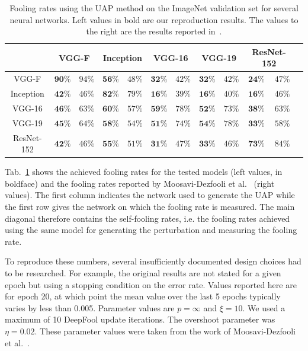 \documentclass[runningheads]{llncs}
\begin{document}
\bgroup

\setlength\tabcolsep{0.19cm}
\begin{table}[htbp]
\centering
\caption{Fooling rates using the UAP method on the ImageNet validation set for several neural networks. Left values in bold are our reproduction results. The values to the right are the results reported in~\cite{moosavidezfooli_universal_2017}.}
\begin{tabular}{|c|c|c|c|c|c|c|c|c|c|c|c|}
\hline

			& \multicolumn{2}{|c|}{VGG-F}			&	\multicolumn{2}{|c|}{Inception}		&	\multicolumn{2}{|c|}{VGG-16}			&	\multicolumn{2}{|c|}{VGG-19}			&	\multicolumn{2}{|c|}{ResNet-152}	\\ \hline
VGG-F		& $\mathbf{90\%} $&$ 94\%$	&	$\mathbf{56\%} $&$ 48\%$	&	$\mathbf{32\%} $&$ 42\%$	&	$\mathbf{32\%} $&$ 42\%$	& 	$\mathbf{24\%} $&$ 47\%$		\\
Inception	& $\mathbf{42\%} $&$ 46\%$	&	$\mathbf{82\%} $&$ 79\%$	&	$\mathbf{16\%} $&$ 39\%$	&	$\mathbf{16\%} $&$ 40\%$	& 	$\mathbf{16\%} $&$ 46\%$	\\
VGG-16		& $\mathbf{46\%} $&$ 63\%$	&	$\mathbf{60\%} $&$ 57\%$	&	$\mathbf{59\%} $&$ 78\%$	&	$\mathbf{52\%} $&$ 73\%$	& 	$\mathbf{38\%} $&$ 63\%$	\\
VGG-19		& $\mathbf{45\%} $&$ 64\%$	&	$\mathbf{58\%} $&$ 54\%$	&	$\mathbf{51\%} $&$ 74\%$	&	$\mathbf{54\%} $&$ 78\%$	& 	$\mathbf{33\%} $&$ 58\%$	\\
ResNet-152	& $\mathbf{42\%} $&$ 46\%$	&	$\mathbf{55\%} $&$ 51\%$	&	$\mathbf{31\%} $&$ 47\%$	&	$\mathbf{33\%} $&$ 46\%$	& 	$\mathbf{73\%} $&$ 84\%$	\\
\hline 
\end{tabular}
\label{tbl_stoerraten_reprod_kreuz_linf}
\end{table}
\egroup

Tab.~\ref{tbl_stoerraten_reprod_kreuz_linf} shows the achieved fooling rates for the tested models (left values, in boldface) and the fooling rates reported by Moosavi-Dezfooli et al.~\cite{moosavidezfooli_universal_2017} (right values). The first column indicates the network used to generate the UAP while the first row gives the network on which the fooling rate is measured. The main diagonal therefore contains the self-fooling rates, i.e. the fooling rates achieved using the same model for generating the perturbation and measuring the fooling rate. 

To reproduce these numbers, several insufficiently documented design choices had to be researched. For example, the original results are not stated for a given epoch but using a stopping condition on the error rate. Values reported here are for epoch 20, at which point the mean value over the last 5 epochs typically varies by less than 0.005. Parameter values are \(p=\infty\) and \(\xi=10\). We used a maximum of 10 DeepFool update iterations. The overshoot parameter was \(\eta=0.02\). These parameter values were taken from the work of Moosavi-Dezfooli et al.~\cite{moosavidezfooli_universal_2017,moosavi-dezfooli_deepfool_2016}. 
\end{document}

